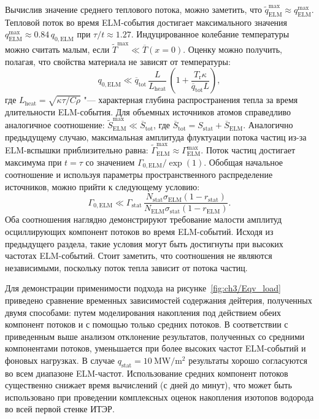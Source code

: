 Вычислив значение среднего теплового потока, можно заметить, что $\widetilde{q}_{\mathrm{ELM}}^{\max} \approx q_{\mathrm{ELM}}^{\max}$. Тепловой поток во время ELM-события достигает максимального значения $q_{\mathrm{ELM}}^{\max}\approx 0.84 \, q_{0,\mathrm{ELM}}$ при $\tau/t\approx 1.27$. Индуцированное колебание температуры можно считать малым, если $\widetilde{T}^{\max} \ll \overline{T}(x=0)$. Оценку можно получить, полагая, что свойства материала не зависят от температуры:
\begin{equation}
	\label{eq:heat_condition}
	q_{0,\mathrm{ELM}} \ll \overline{q}_{\mathrm{tot}}\,\frac{ L}{L_{\mathrm{heat}}}\,\left( 1+\frac{T_\mathrm{r}\kappa}{\overline{q}_{\mathrm{tot}}L}\right),
\end{equation}
где $L_{\mathrm{heat}}=\sqrt{\kappa\tau/C\rho}$ "--- характерная глубина распространения тепла за время длительности ELM-события. Для объемных источников атомов справедливо аналогичное соотношение: $\widetilde{S}^{\max}_{\mathrm{ELM}} \ll \overline{S}_{\mathrm{tot}}$, где $\overline{S}_{\mathrm{tot}}=S_{\mathrm{stat}}+\overline{S}_{\mathrm{ELM}}$. Аналогично предыдущему случаю, максимальная амплитуда флуктуации потока частиц из-за ELM-вспышки приблизительно равна: $\widetilde{\Gamma}_{\mathrm{ELM}}^{\max} \approx \Gamma_{\mathrm{ELM}}^{\max}$. Поток частиц достигает максимума при $t=\tau$ со значением $\Gamma_{0,\mathrm{ELM}}/\exp(1)$. Обобщая начальное соотношение и используя параметры пространственного распределение источников, можно прийти к следующему условию:
\begin{equation}
	\label{eq:flux_condition}
	\Gamma_{0,\mathrm{ELM}} \ll \Gamma_{\mathrm{stat}}\,\frac{N_{\mathrm{stat}}\sigma_{\mathrm{ELM}}(1-r_{\mathrm{stat}})}{N_{\mathrm{ELM}}\sigma_{\mathrm{stat}}(1-r_{\mathrm{ELM}})}.
\end{equation}
Оба соотношения наглядно демонстрируют требование малости амплитуд осциллирующих компонент потоков во время ELM-событий. Исходя из предыдущего раздела, такие условия могут быть достигнуты при высоких частотах ELM-событий. Стоит заметить, что соотношения не являются независимыми, поскольку поток тепла зависит от потока частиц.

Для демонстрации применимости подхода на рисунке~\cref{fig:ch3/Eqv_load} приведено сравнение временных зависимостей содержания дейтерия, полученных двумя способами: путем моделирования накопления под действием обеих компонент потоков и с помощью только средних потоков. В соответствии с приведенным выше анализом отклонение результатов, полученных со средними компонентами потоков, уменьшается при более высоких частот ELM-событий и фоновых нагрузках. В случае $q_{\mathrm{stat}}=\SI{10}{\mega\watt\per\meter\squared}$ результаты хорошо согласуются во всем диапазоне ELM-частот. Использование средних компонент потоков существенно снижает время вычислений (с дней до минут), что может быть использовано при проведении комплексных оценок накопления изотопов водорода во всей первой стенке ИТЭР.

